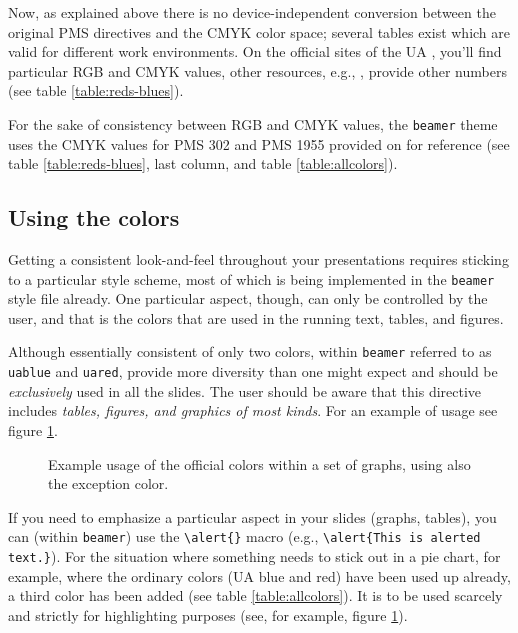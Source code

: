 Now, as explained above there is no device-independent conversion between the original PMS directives and the CMYK color space; several tables exist which are valid for different work environments. On the official sites of the UA \cite{KAN::}, you'll find particular RGB and CMYK values, other resources, e.g., \cite{::TDC}, provide other numbers (see table \ref{table:reds-blues}).

For the sake of consistency between RGB and CMYK values, the \texttt{beamer} theme uses the CMYK values for PMS 302 and PMS 1955 provided on \cite{::TDC} for reference (see table \ref{table:reds-blues}, last column, and table \ref{table:allcolors}).

\subsection{Using the colors}\label{subsection:usingthecolors}


Getting a consistent look-and-feel throughout your presentations requires sticking to a particular style scheme, most of which is being implemented in the \texttt{beamer} style file already. One particular aspect, though, can only be controlled by the user, and that is the colors that are used in the running text, tables, and figures.

Although essentially consistent of only two colors, within \texttt{beamer} referred to as \lstinline!uablue! and \lstinline!uared!, provide more diversity than one might expect and should be  \emph{exclusively} used  in all the slides. The user should be aware that this directive includes \emph{tables, figures, and graphics of most kinds}. For an example of usage see figure \ref{fig:coloredgraphs}.

\begin{figure}
\setlength{\figurewidth}{10cm}
\setlength{\figureheight}{5cm}
\centering

\caption{Example usage of the official colors within a set of graphs, using also the exception color.}
\label{fig:coloredgraphs}
\end{figure}

If you need to emphasize a particular aspect in your slides (graphs, tables), you can (within \texttt{beamer}) use the \lstinline!\alert{}! macro (e.g., \lstinline!\alert{This is alerted text.}!). For the situation where something needs to stick out in a pie chart, for example, where the ordinary colors (UA blue and red) have been used up already, a third color has been added (see table \ref{table:allcolors}). It is to be used scarcely and strictly for highlighting purposes (see, for example, figure \ref{fig:coloredgraphs}).



